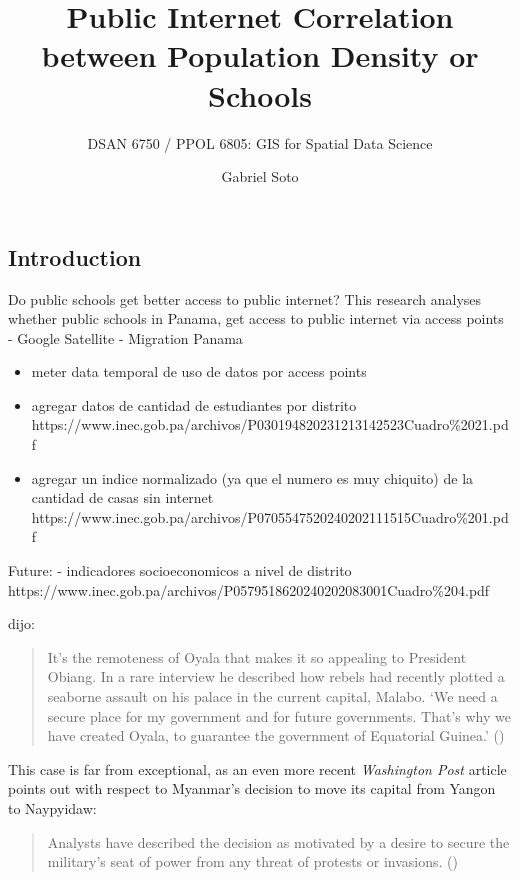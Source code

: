 \documentclass[
  letterpaper,
  DIV=11,
  numbers=noendperiod]{scrartcl}
\title{Public Internet Correlation between Population Density or
Schools}
\subtitle{DSAN 6750 / PPOL 6805: GIS for Spatial Data Science}
\author{Gabriel Soto}
\date{}
\providecommand{\tightlist}{%
  \setlength{\itemsep}{0pt}\setlength{\parskip}{0pt}}\usepackage{longtable,booktabs,array}
\begin{document}
\maketitle

\subsection{Introduction}\label{introduction}

Do public schools get better access to public internet? This research
analyses whether public schools in Panama, get access to public internet
via access points - Google Satellite - Migration Panama

\begin{itemize}
\tightlist
\item
  meter data temporal de uso de datos por access points
\item
  agregar datos de cantidad de estudiantes por distrito
  https://www.inec.gob.pa/archivos/P030194820231213142523Cuadro\%2021.pdf
\item
  agregar un indice normalizado (ya que el numero es muy chiquito) de la
  cantidad de casas sin internet
  https://www.inec.gob.pa/archivos/P0705547520240202111515Cuadro\%201.pdf
\end{itemize}

Future: - indicadores socioeconomicos a nivel de distrito
https://www.inec.gob.pa/archivos/P0579518620240202083001Cuadro\%204.pdf

dijo:

\begin{quote}
It's the remoteness of Oyala that makes it so appealing to President
Obiang. In a rare interview he described how rebels had recently plotted
a seaborne assault on his palace in the current capital, Malabo. `We
need a secure place for my government and for future governments. That's
why we have created Oyala, to guarantee the government of Equatorial
Guinea.' ()
\end{quote}

This case is far from exceptional, as an even more recent
\emph{Washington Post} article points out with respect to Myanmar's
decision to move its capital from Yangon to Naypyidaw:

\begin{quote}
Analysts have described the decision as motivated by a desire to secure
the military's seat of power from any threat of protests or invasions.
()
\end{quote}
\end{document}
